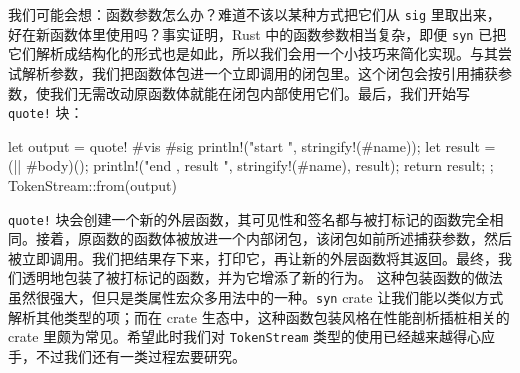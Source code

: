 \label{idx:idx_e121b76b}
\label{idx:idx_debb24c4}
我们可能会想：函数参数怎么办？难道不该以某种方式把它们从 \texttt{sig} 里取出来，好在新函数体里使用吗？事实证明，Rust 中的函数参数相当复杂，即便 \texttt{syn} 已把它们解析成结构化的形式也是如此，所以我们会用一个小技巧来简化实现。与其尝试解析参数，我们把函数体包进一个立即调用的闭包里。这个闭包会按引用捕获参数，使我们无需改动原函数体就能在闭包内部使用它们。最后，我们开始写 \texttt{quote!} 块：
\begin{codebox}[rust]
    let output = quote! {
        #vis #sig {
            println!("start {}", stringify!(#name));
            let result = (|| #body)();
            println!("end {}, result {}", stringify!(#name), result);
            return result;
        }
    };
    TokenStream::from(output)
\end{codebox}
\texttt{quote!} 块会创建一个新的外层函数，其可见性和签名都与被打标记的函数完全相同。接着，原函数的函数体被放进一个内部闭包，该闭包如前所述捕获参数，然后被立即调用。我们把结果存下来，打印它，再让新的外层函数将其返回。最终，我们透明地包装了被打标记的函数，并为它增添了新的行为。
\label{idx:idx_c9f8501e}
\label{idx:idx_14430ab1}
这种包装函数的做法虽然很强大，但只是类属性宏众多用法中的一种。\texttt{syn} crate 让我们能以类似方式解析其他类型的项；而在 crate 生态中，这种函数包装风格在性能剖析插桩相关的 crate 里颇为常见。希望此时我们对 \texttt{TokenStream} 类型的使用已经越来越得心应手，不过我们还有一类过程宏要研究。
